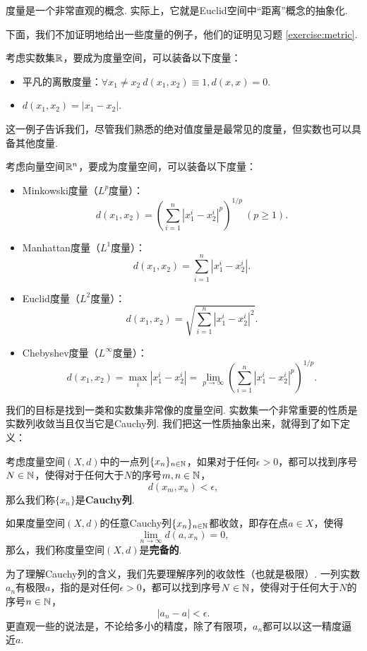 度量是一个非常直观的概念. 实际上，它就是Euclid空间中“距离”概念的抽象化. 

下面，我们不加证明地给出一些度量的例子，他们的证明见习题 \ref{exercise:metric}.
\begin{example}\label{ex:metric-main}
    考虑实数集$\mathbb{R}$，要成为度量空间，可以装备以下度量：
    \begin{itemize}
            \item 平凡的离散度量：$\forall x_1\neq x_2\ d(x_1,x_2)\equiv 1, d(x,x)=0$. 
            \item $d(x_1,x_2)=|x_1-x_2|$. 
        \end{itemize}
        这一例子告诉我们，尽管我们熟悉的绝对值度量是最常见的度量，但实数也可以具备其他度量.

        考虑向量空间$\mathbb{R}^n$，要成为度量空间，可以装备以下度量：
        \begin{itemize}
            \item Minkowski度量（$L^p$度量）：
            \[d(x_1,x_2)=\left(\sum_{i=1}^n|x_1^i-x_2^i|^p\right)^{1/p}\ (p\geq 1).\] 
            \item Manhattan度量（$L^1$度量）：
            \[d(x_1,x_2)=\sum_{i=1}^n|x_1^i-x_2^i|.\]
            \item Euclid度量（$L^2$度量）：
            \[d(x_1,x_2)=\sqrt{\sum_{i=1}^n|x_1^i-x_2^i|^2}.\]
            \item Chebyshev度量（$L^\infty$度量）：
            \[d(x_1,x_2)=\max_i|x_1^i-x_2^i|=\lim_{p\to\infty}\left(\sum_{i=1}^n|x_1^i-x_2^i|^p\right)^{1/p}.\]
        \end{itemize}
\end{example}

我们的目标是找到一类和实数集非常像的度量空间. 实数集一个非常重要的性质是实数列收敛当且仅当它是Cauchy列. 我们把这一性质抽象出来，就得到了如下定义：

\begin{definition}
    考虑度量空间$(X,d)$中的一点列$\{x_n\}_{n\in \mathbb{N}}$，如果对于任何$\epsilon>0$，都可以找到序号$N\in\mathbb{N}$，使得对于任何大于$N$的序号$m,n\in\mathbb{N}$，
    \[d(x_m,x_n)<\epsilon,\]
    那么我们称$\{x_n\}$是\textbf{Cauchy列}.

    如果度量空间$(X,d)$的任意Cauchy列$\{x_n\}_{n\in \mathbb{N}}$都收敛，即存在点$a\in X$，使得
    \[\lim_{n\to\infty}d(a,x_n)=0,\]
    那么，我们称度量空间$(X,d)$是\textbf{完备的}. 
\end{definition}

为了理解Cauchy列的含义，我们先要理解序列的收敛性（也就是极限）. 一列实数$a_n$有极限$a$，指的是对任何$\epsilon>0$，都可以找到序号$N\in\mathbb{N}$，使得对于任何大于$N$的序号$n\in\mathbb{N}$，
\[
    |a_n-a|<\epsilon.
\]
更直观一些的说法是，不论给多小的精度，除了有限项，$a_n$都可以以这一精度逼近$a$. 

